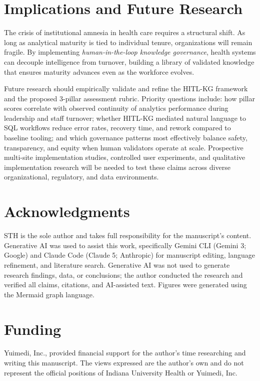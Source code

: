 \documentclass[
  american,
  11pt,
  letterpaper,
  oneside  ,captions=tableheading
]{scrartcl}
\begin{document}
\section{Implications and Future
Research}\label{implications-and-future-research}

The crisis of institutional amnesia in health care requires a structural
shift. As long as analytical maturity is tied to individual tenure,
organizations will remain fragile. By implementing
\emph{human-in-the-loop knowledge governance}, health systems can
decouple intelligence from turnover, building a library of validated
knowledge that ensures maturity advances even as the workforce evolves.

Future research should empirically validate and refine the HITL-KG
framework and the proposed 3-pillar assessment rubric. Priority
questions include: how pillar scores correlate with observed continuity
of analytics performance during leadership and staff turnover; whether
HITL-KG mediated natural language to SQL workflows reduce error rates,
recovery time, and rework compared to baseline tooling; and which
governance patterns most effectively balance safety, transparency, and
equity when human validators operate at scale. Prospective multi-site
implementation studies, controlled user experiments, and qualitative
implementation research will be needed to test these claims across
diverse organizational, regulatory, and data environments.

\section{Acknowledgments}\label{acknowledgments}

STH is the sole author and takes full responsibility for the
manuscript's content. Generative AI was used to assist this work,
specifically Gemini CLI (Gemini 3; Google) and Claude Code (Claude 5;
Anthropic) for manuscript editing, language refinement, and literature
search. Generative AI was not used to generate research findings, data,
or conclusions; the author conducted the research and verified all
claims, citations, and AI-assisted text. Figures were generated using
the Mermaid graph language.

\section{Funding}\label{funding}

Yuimedi, Inc., provided financial support for the author's time
researching and writing this manuscript. The views expressed are the
author's own and do not represent the official positions of Indiana
University Health or Yuimedi, Inc.
\end{document}

